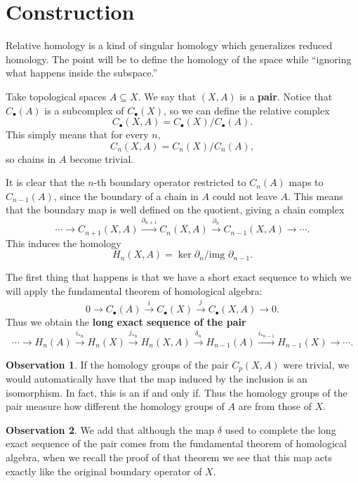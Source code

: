 \documentclass{book}
\theoremstyle{definition}
\newtheorem*{obs}{Observation}
\begin{document}
\section{Construction}

Relative homology is a kind of singular homology which
generalizes reduced homology. The point will be to define the
homology of the space while ``ignoring what happens inside
the subspace.''

Take topological spaces $A\subseteq X$. We say that $(X,A)$
is a \textbf{pair}. Notice that $C_\bullet(A)$ is a
subcomplex of $C_\bullet(X)$, so we can define the relative
complex
$$
C_\bullet(X,A)=C_\bullet(X)/C_\bullet(A).
$$
This simply means that for every $n$,
$$
C_n(X,A)=C_n(X)/C_n(A),
$$
so chains in $A$ become trivial.

It is clear that the $n$-th boundary operator restricted to
$C_n(A)$ maps to $C_{n-1}(A)$, since the boundary of a chain
in $A$ could not leave $A$. This means that the boundary map
is well defined on the quotient, giving a chain complex
$$
\cdots\to C_{n+1}(X,A)\xrightarrow{\partial_{n+1}}
C_n(X,A)\xrightarrow{\partial_n}C_{n-1}(X,A)\to\cdots.
$$
This induces the homology
$$
H_n(X,A)=\ker\partial_n/\text{img }\partial_{n-1}.
$$

The first thing that happens is that we have a short exact
sequence to which we will apply the fundamental theorem of
homological algebra:
$$
0\to C_\bullet(A)\xrightarrow{i}C_\bullet(X)
\xrightarrow{j}C_\bullet(X,A)\to0.
$$
Thus we obtain the \textbf{long exact sequence of the pair}
$$
\cdots\to H_n(A)\xrightarrow{i_{*n}}H_n(X)
\xrightarrow{j_{*n}}H_n(X,A)\xrightarrow{\delta_n}
H_{n-1}(A)\xrightarrow{i_{*n-1}}H_{n-1}(X)\to\cdots.
$$

\begin{obs}
If the homology groups of the pair $C_p(X,A)$ were trivial,
we would automatically have that the map induced by the
inclusion is an isomorphism. In fact, this is an if and only
if. Thus the homology groups of the pair measure how
different the homology groups of $A$ are from those of $X$.
\end{obs}

\begin{obs}
We add that although the map $\delta$ used to complete the
long exact sequence of the pair comes from the fundamental
theorem of homological algebra, when we recall the proof of
that theorem we see that this map acts exactly like the
original boundary operator of $X$.
\end{obs}
\end{document}

